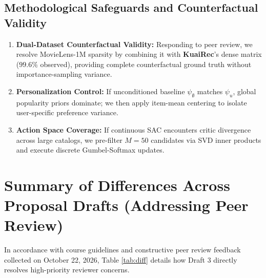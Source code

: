 \documentclass{article}
\begin{document}
\subsection{Methodological Safeguards and Counterfactual Validity}
\begin{enumerate}[leftmargin=*, nosep]
    \item \textbf{Dual-Dataset Counterfactual Validity:} Responding to peer review, we resolve MovieLens-1M sparsity by combining it with \textbf{KuaiRec}'s dense matrix ($99.6\%$ observed), providing complete counterfactual ground truth without importance-sampling variance.
    \item \textbf{Personalization Control:} If unconditioned baseline $\psi_{\emptyset}$ matches $\psi_u$, global popularity priors dominate; we then apply item-mean centering to isolate user-specific preference variance.
    \item \textbf{Action Space Coverage:} If continuous SAC encounters critic divergence across large catalogs, we pre-filter $M=50$ candidates via SVD inner products and execute discrete Gumbel-Softmax updates.
\end{enumerate}

\newpage



\newpage
\appendix

\section{Summary of Differences Across Proposal Drafts (Addressing Peer Review)}
In accordance with course guidelines and constructive peer review feedback collected on October 22, 2026, Table \ref{tab:diff} details how Draft 3 directly resolves high-priority reviewer concerns.
\end{document}

